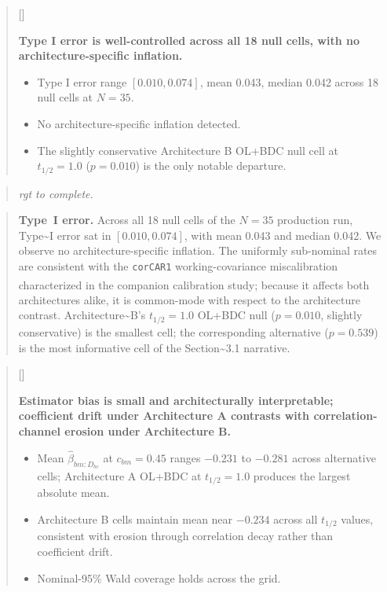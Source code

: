 \documentclass[
  11pt,
]{article}
\newcounter{pgraph}
\newenvironment{bullets}{%
  \stepcounter{pgraph}%
  \begin{quote}\small\sffamily\color[gray]{0.30}%
  {\normalfont\scriptsize\color[gray]{0.58}[\thepgraph]\enspace}}{%
  \end{quote}}
\newenvironment{rgt}{%
  \begin{quote}\small\itshape\color[RGB]{20,60,160}}{%
  \end{quote}}
\newenvironment{orig}{%
  \begin{quote}\normalsize\color[gray]{0.55}}{%
  \end{quote}}
\begin{document}
\begin{bullets}

\textbf{Type I error is well-controlled across all 18 null
cells, with no architecture-specific inflation.}

\begin{itemize}\setlength{\itemsep}{2pt}\setlength{\parskip}{0pt}
\item Type I error range $[0.010, 0.074]$, mean 0.043, median
  0.042 across 18 null cells at $N = 35$.
\item No architecture-specific inflation detected.
\item The slightly conservative Architecture B OL+BDC null cell
  at $t_{1/2} = 1.0$ ($p = 0.010$) is the only notable
  departure.
\end{itemize}

\end{bullets}

\begin{rgt}
rgt to complete.

\end{rgt}

\begin{orig}
\textbf{Type~I error.} Across all 18 null cells of the \(N = 35\)
production run, Type\textasciitilde I error sat in \([0.010, 0.074]\),
with mean 0.043 and median 0.042. We observe no architecture-specific
inflation. The uniformly sub-nominal rates are consistent with the
\texttt{corCAR1} working-covariance miscalibration characterized in the
companion calibration
study\textsuperscript{}; because it
affects both architectures alike, it is common-mode with respect to the
architecture contrast. Architecture\textasciitilde B's \(t_{1/2} = 1.0\)
OL+BDC null (\(p = 0.010\), slightly conservative) is the smallest cell;
the corresponding alternative (\(p = 0.539\)) is the most informative
cell of the Section\textasciitilde3.1 narrative.

\end{orig}

\begin{bullets}

\textbf{Estimator bias is small and architecturally
interpretable; coefficient drift under Architecture A
contrasts with correlation-channel erosion under
Architecture B.}

\begin{itemize}\setlength{\itemsep}{2pt}\setlength{\parskip}{0pt}
\item Mean $\hat\beta_{bm:D_{bc}}$ at $c_{bm} = 0.45$ ranges
  $-0.231$ to $-0.281$ across alternative cells; Architecture A
  OL+BDC at $t_{1/2} = 1.0$ produces the largest absolute
  mean.
\item Architecture B cells maintain mean near $-0.234$ across
  all $t_{1/2}$ values, consistent with erosion through
  correlation decay rather than coefficient drift.
\item Nominal-95\% Wald coverage holds across the grid.
\end{itemize}

\end{bullets}
\end{document}
